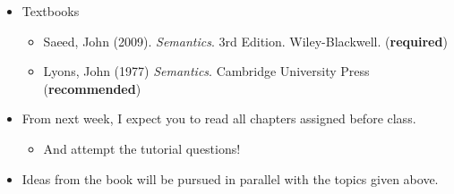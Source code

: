 \documentclass[headrule,footrule]{foils}
\begin{document}

\begin{itemize}
\item Textbooks
  \begin{itemize}
  \item Saeed, John (2009). \textit{Semantics}. 3rd Edition. Wiley-Blackwell. (\textbf{required})
  \item Lyons, John (1977) \textit{Semantics}.  Cambridge University Press (\textbf{recommended})
  \end{itemize}
\item From next week, I expect you to read all chapters assigned
  before class.
  \begin{itemize}
  \item And attempt the tutorial questions!
  \end{itemize}
\item Ideas from the book will be pursued in parallel with the
  topics given above.
\end{itemize}








\end{document}
